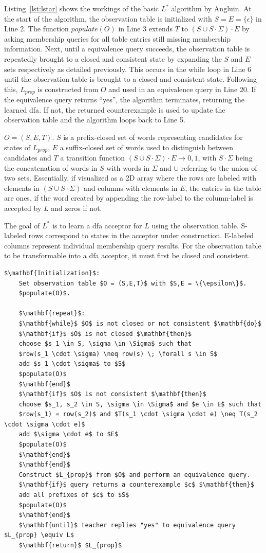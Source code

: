 Listing~\ref{lst:lstar} shows the workings of the basic $L^*$ algorithm by Angluin. At the start of the algorithm, the observation table is initialized with $S = E = \{\epsilon\}$ in Line 2. The function $populate(O)$ in Line 3 extends $T$ to $(S \cup S \cdot \Sigma) \cdot E$ by asking membership queries for all table entries still missing membership information. Next, until a equivalence query succeeds, the observation table is repeatedly brought to a closed and consistent state by expanding the $S$ and $E$ sets respectively as detailed previously. This occurs in the while loop in Line 6 until the observation table is brought to a closed and consistent state. Following this, $L_{prop}$ is constructed from $O$ and used in an equivalence query in Line 20. If the equivalence query returns ``yes'', the algorithm terminates, returning the learned \ac{dfa}. If not, the returned counterexample is used to update the observation table and the algorithm loops back to Line 5. 


$O = (S,E,T)$. $S$ is a prefix-closed set of words representing candidates for states of $L_{prop}$, $E$ a suffix-closed set of words used to distinguish between candidates and $T$ a transition function $(S \cup S \cdot \Sigma) \cdot E \rightarrow {0,1}$, with $S \cdot \Sigma$ being the concatenation of words in $S$ with words in $\Sigma$ and $\cup$ referring to the union of two sets. Essentially, if visualized as a 2D array where the rows are labeled with elements in $(S \cup S \cdot \Sigma)$ and columns with elements in $E$, the entries in the table are ones, if the word created by appending the row-label to the column-label is accepted by $L$ and zeros if not. 

The goal of $L^*$ is to learn a \ac{dfa} acceptor for $L$ using the observation table. S-labeled rows correspond to states in the acceptor under construction. E-labeled columns represent individual membership query results. For the observation table to be transformable into a \ac{dfa} acceptor, it must first be closed and consistent.

\begin{lstlisting}[mathescape=true, float=b, caption=$L^*$ algorithm, label=lst:lstar]
	$\mathbf{Initialization}$: 
	Set observation table $O = (S,E,T)$ with $S,E = \{\epsilon\}$.
	$populate(O)$.
	
	$\mathbf{repeat}$:
	$\mathbf{while}$ $O$ is not closed or not consistent $\mathbf{do}$
	$\mathbf{if}$ $O$ is not closed $\mathbf{then}$
	choose $s_1 \in S, \sigma \in \Sigma$ such that
	$row(s_1 \cdot \sigma) \neq row(s) \; \forall s \in S$
	add $s_1 \cdot \sigma$ to $S$
	$populate(O)$
	$\mathbf{end}$
	$\mathbf{if}$ $O$ is not consistent $\mathbf{then}$
	choose $s_1, s_2 \in S, \sigma \in \Sigma$ and $e \in E$ such that
	$row(s_1) = row(s_2)$ and $T(s_1 \cdot \sigma \cdot e) \neq T(s_2 \cdot \sigma \cdot e)$
	add $\sigma \cdot e$ to $E$
	$populate(O)$
	$\mathbf{end}$		
	$\mathbf{end}$
	Construct $L_{prop}$ from $O$ and perform an equivalence query.	
	$\mathbf{if}$ query returns a counterexample $c$ $\mathbf{then}$
	add all prefixes of $c$ to $S$
	$populate(O)$
	$\mathbf{end}$
	$\mathbf{until}$ teacher replies "yes" to equivalence query $L_{prop} \equiv L$
	$\mathbf{return}$ $L_{prop}$
\end{lstlisting}
\fi


